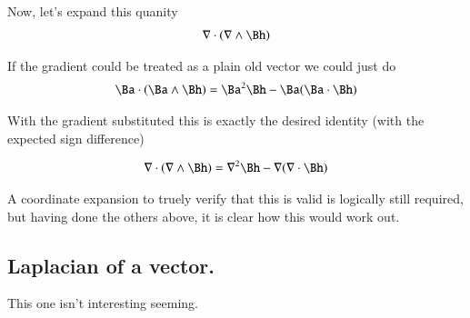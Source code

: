 \documentclass{article}
\begin{document}
Now, let's expand this quanity
\begin{align*}
\grad \cdot (\grad \wedge \Bh)
\end{align*}

If the gradient could be treated as a plain old vector we could just do
\begin{align*}
\Ba \cdot (\Ba \wedge \Bh) &= \Ba^2 \Bh - \Ba(\Ba \cdot \Bh) \\
\end{align*}

With the gradient substituted this is exactly the desired identity (with the expected sign difference)

\begin{align*}
\grad \cdot (\grad \wedge \Bh) &= \grad^2 \Bh - \grad(\grad \cdot \Bh) \\
\end{align*}

A coordinate expansion to truely verify that this is valid is logically still required, but having done the others above, it is clear how this
would work out.

\subsection{ Laplacian of a vector. }

This one isn't interesting seeming.



\end{document}
